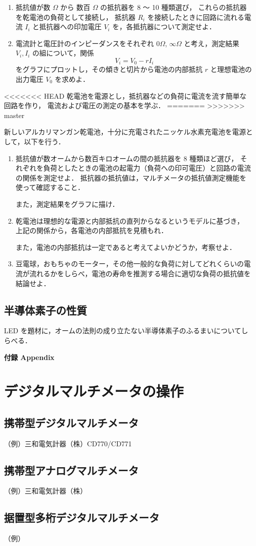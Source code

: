 \documentclass[11pt,sort]{jarticle}
\begin{document}
\begin{enumerate}
\item
抵抗値が数 $\Omega$ から 数百 $\Omega$ の抵抗器を 8 〜 10 種類選び，
これらの抵抗器を乾電池の負荷として接続し，
抵抗器 $R_i$ を接続したときに回路に流れる電流 $I_i$ と抵抗器への印加電圧 $V_i$ を，各抵抗器について測定せよ．
\item
電流計と電圧計のインピーダンスをそれぞれ $0 \Omega$, $\infty \Omega$ と考え，測定結果 $V_i, I_i$ の組について，関係
\[
V_i = V_0 - r I_i
\]
をグラフにプロットし，その傾きと切片から電池の内部抵抗 $r$ と理想電池の出力電圧 $V_0$ を求めよ．
\end{enumerate}

<<<<<<< HEAD
乾電池を電源とし，抵抗器などの負荷に電流を流す簡単な回路を作り，
電流および電圧の測定の基本を学ぶ．
=======
>>>>>>> master

新しいアルカリマンガン乾電池，十分に充電されたニッケル水素充電池を電源として，以下を行う．
\begin{enumerate}
\item
抵抗値が数オームから数百キロオームの間の抵抗器を 8 種類ほど選び，
それぞれを負荷としたときの電池の起電力（負荷への印可電圧）と回路の電流の関係を測定せよ．
抵抗器の抵抗値は，マルチメータの抵抗値測定機能を使って確認すること．

また，測定結果をグラフに描け．
\item
乾電池は理想的な電源と内部抵抗の直列からなるというモデルに基づき，
上記の関係から，各電池の内部抵抗を見積もれ．

また，電池の内部抵抗は一定であると考えてよいかどうか，考察せよ．
\item
豆電球，おもちゃのモーター，その他一般的な負荷に対してどれくらいの電流が流れるかをしらべ，電池の寿命を推測する場合に適切な負荷の抵抗値を結論せよ．
\end{enumerate}

\subsection{半導体素子の性質}\label{b}

LED を題材に，オームの法則の成り立たない半導体素子のふるまいについてしらべる．





\newpage
\appendix
\noindent
{\LARGE\bf 付録 Appendix}

\section{デジタルマルチメータの操作}

\subsection{携帯型デジタルマルチメータ}
（例）三和電気計器（株）CD770/CD771

\subsection{携帯型アナログマルチメータ}
（例）三和電気計器（株）

\subsection{据置型多桁デジタルマルチメータ}
（例）
\end{document}
